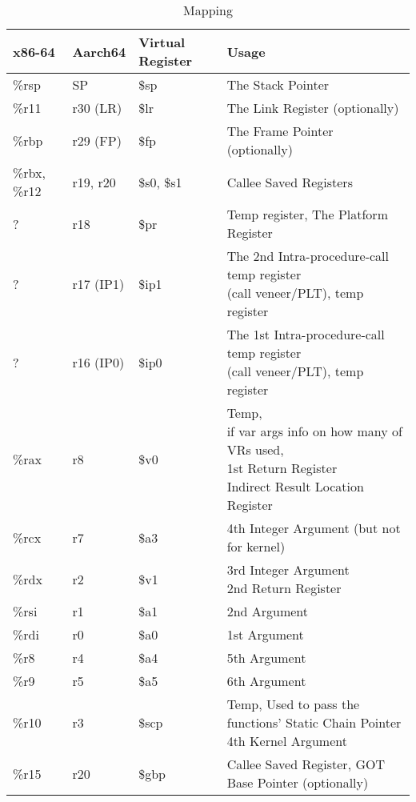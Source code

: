 \documentclass[11pt]{article}
\begin{document}
\begin{table}[ht]
\caption{Mapping}
\begin{adjustwidth}{-3cm}{-3cm}
\begin{tabular}{|l|l|l|l|}
    \hline
    \textbf{x86-64} & \textbf{Aarch64} & \textbf{Virtual Register} & \textbf{Usage} \\
    \hline
    \%rsp & SP & \$sp & The Stack Pointer \\
    \hline
    \%r11 & r30 (LR) & \$lr & The Link Register (optionally) \\
    \hline
    \%rbp & r29 (FP) & \$fp & The Frame Pointer (optionally) \\
    \hline
    \%rbx, \%r12 & r19, r20 & \$s0, \$s1 & Callee Saved Registers \\
    \hline
    ? & r18 & \$pr & Temp register, The Platform Register \\
    \hline
    ? & r17 (IP1) & \$ip1 & \pbox{20cm}{The 2nd Intra-procedure-call temp register \\ (call veneer/PLT), temp register} \\
    \hline
    ? & r16 (IP0) & \$ip0 & \pbox{20cm}{The 1st Intra-procedure-call temp register \\ (call veneer/PLT), temp register} \\
    \hline
    \%rax & r8 & \$v0 & \pbox{20cm}{Temp, \\  if var args info on how many of VRs used, \\ 1st Return Register \\ Indirect Result Location Register} \\
    \hline
    \%rcx & r7 & \$a3 & 4th Integer Argument (but not for kernel) \\
    \hline
    \%rdx & r2 & \$v1 & \pbox{20cm}{3rd Integer Argument \\ 2nd Return Register} \\
    \hline
    \%rsi & r1 & \$a1 & 2nd Argument \\
    \hline
    \%rdi & r0 & \$a0 & 1st Argument \\
    \hline
    \%r8 & r4 & \$a4 & 5th Argument \\
    \hline
    \%r9 & r5 & \$a5 & 6th Argument \\
    \hline
    \%r10 & r3 & \$scp & \pbox{20cm}{Temp, Used to pass the functions' Static Chain Pointer \\ 4th Kernel Argument} \\
    \hline
    \%r15 & r20 & \$gbp & Callee Saved Register, GOT Base Pointer (optionally) \\
    \hline
\end{tabular}
\end{adjustwidth}\label{tab:mappings}
\end{table}
\end{document}
